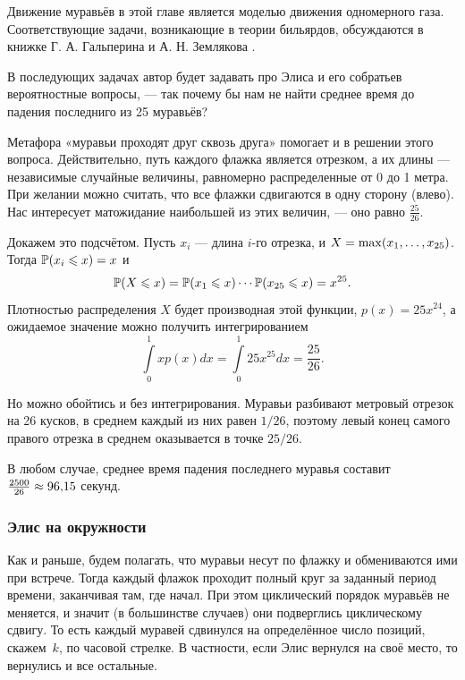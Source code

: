\begin{addedbytheeditors}
Движение муравьёв в этой главе является моделью движения одномерного газа.
Соответствующие задачи, возникающие в теории бильярдов, обсуждаются в книжке
Г. А. Гальперина и  А. Н. Землякова \cite{zemlyakov-galperin}.

В последующих задачах автор будет задавать про Элиса и его собратьев вероятностные вопросы, --- так почему бы нам не найти среднее время до падения последниго из 25 муравьёв?

Метафора «муравьи проходят друг сквозь друга» помогает и в решении этого вопроса.
Действительно, путь каждого флажка является отрезком,
а их длины --- независимые случайные величины, равномерно распределенные от 0 до 1 метра.
При желании можно считать, что все флажки сдвигаются в одну сторону (влево).
Нас интересует матожидание наибольшей из этих величин, --- оно равно $\frac{25}{26}$.

Докажем это подсчётом.
Пусть $x_i$ --- длина $i$-го отрезка, и $X=\max(x_1, \z\dots, x_{25})$.
Тогда $\mathbb{P}(x_i\leqslant x)=x$ и
\[\mathbb{P}(X\leqslant x)=\mathbb{P}(x_1\leqslant x)\cdots \mathbb{P}(x_{25}\leqslant x)=x^{25}.\]
Плотностью распределения $X$ будет производная этой функции, $p(x) =25x^{24}$, а ожидаемое значение можно получить интегрированием
\[\int\limits_0^1 x p(x) dx =  \int\limits_0^1 25x^{25} dx = \frac{25}{26}.\]

Но можно обойтись и без интегрирования.
Муравьи разбивают метровый отрезок на 26 кусков, в среднем каждый из них равен $1/26$, поэтому левый конец самого правого отрезка в среднем оказывается в точке $25/26$.

В любом случае, среднее время падения последнего муравья составит $\frac{2500}{26} \z\approx 96{,}15$ секунд.\pr
\end{addedbytheeditors}

\subsubsection*{Элис на окружности}

Как и раньше, будем полагать, что муравьи несут по флажку и обмениваются ими при встрече.
Тогда каждый флажок проходит полный круг за заданный период времени, заканчивая там, где начал.
При этом циклический порядок муравьёв не меняется, и значит (в большинстве случаев) они подверглись циклическому сдвигу.
То есть каждый муравей сдвинулся на определённое число позиций, скажем~$k$, по часовой стрелке.
В частности, если Элис вернулся на своё место, то вернулись и все остальные.


